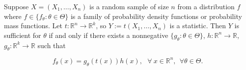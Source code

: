 \begin{theorem}\label{mathstats.factorization.thm} Suppose \(X = (X_1, \ldots, X_n)\) is a random sample of size \(n\) from a distribution \(f\) where \(f \in \{f_\theta: \theta \in \Theta\}\) is a family of probability density functions or probability mass functions.  Let \(t: \mathbb{R}^n \to \mathbb{R}^k\), so \(Y:= t(X_1, \ldots, X_n)\) is a statistic. Then \(Y\) is sufficient for \(\theta\) if and only if there exists a nonnegative \(\{g_\theta: \theta \in \Theta\}\), \(h: \mathbb{R}^n \to \mathbb{R}\), \(g_\theta: \mathbb{R}^k \to \mathbb{R}\) such that

\begin{equation}\label{mathstats.factorization.thm}
f_\theta(x) = g_\theta(t(x)) h(x), \ \ \ \forall \ x \in \mathbb{R}^n, \ \ \forall \theta \in \Theta.
\end{equation}


\end{theorem}

